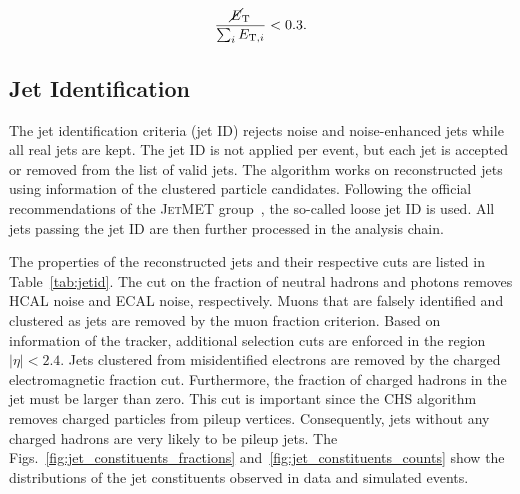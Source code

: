 \begin{equation}
    \frac{\cancel{E}_{\mathrm{T}}}{\sum_i E_{\mathrm{T},i}} < 0.3.
\end{equation}

\subsection{Jet Identification}

The jet identification criteria (jet ID) rejects noise and noise-enhanced jets
while all real jets are kept. The jet ID is not applied per event, but each jet
is accepted or removed from the list of valid jets. The algorithm works on
reconstructed jets using information of the clustered particle candidates.
Following the official recommendations of the \textsc{JetMET}
group~\cite{jetmet:jetid}, the so-called loose jet ID is used. All jets passing the jet ID
are then further processed in the analysis chain. 

The properties of the reconstructed jets and their respective cuts are listed in
Table~\ref{tab:jetid}. The cut on the fraction of neutral hadrons and photons
removes HCAL noise and ECAL noise, respectively. Muons that are falsely
identified and clustered as jets are removed by the muon fraction criterion.
Based on information of the tracker, additional selection cuts are enforced in
the region $|\eta| < 2.4$. Jets clustered from misidentified electrons are removed by the
charged electromagnetic fraction cut. Furthermore, the fraction of charged hadrons in the
jet must be larger than zero. This cut is important since the CHS algorithm
removes charged particles from pileup vertices. Consequently, jets without any
charged hadrons are very likely to be pileup jets. The
Figs.~\ref{fig:jet_constituents_fractions} and~\ref{fig:jet_constituents_counts}
show the distributions of the jet constituents observed in data and simulated
events.

